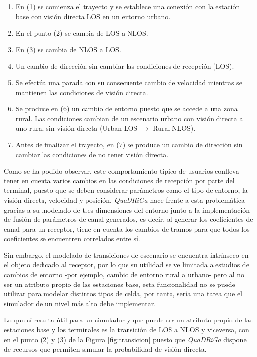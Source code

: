\begin{enumerate}
    \item En (1) se comienza el trayecto y se establece una conexión con la estación base con visión directa LOS en un entorno urbano.
    \item En el punto (2) se cambia de LOS a NLOS.
    \item En (3) se cambia de NLOS a LOS.
    \item Un cambio de dirección sin cambiar las condiciones de recepción (LOS).
    \item Se efectúa una parada con su consecuente cambio de velocidad mientras se mantienen las condiciones de visión directa.
    \item Se produce en (6) un cambio de entorno puesto que se accede a una zona rural. Las condiciones cambian de un escenario urbano con visión directa a uno rural sin visión directa (Urban LOS \(\rightarrow\) Rural NLOS).
    \item Antes de finalizar el trayecto, en (7) se produce un cambio de dirección sin cambiar las condiciones de no tener visión directa.
\end{enumerate}

Como se ha podido observar, este comportamiento típico de usuarios conlleva tener en cuenta varios cambios en las condiciones de recepción por parte del terminal, puesto que se deben considerar parámetros como el tipo de entorno, la visión directa, velocidad y  posición. \textit{QuaDRiGa} hace frente a esta problemática gracias a su modelado de tres dimensiones del entorno junto a la implementación de fusión de parámetros de canal generados, es decir, al generar los coeficientes de canal para un receptor, tiene en cuenta los cambios de tramos para que todos los coeficientes se encuentren correlados entre sí.

Sin embargo, el modelado de transiciones de escenario se encuentra intrínseco en el objeto dedicado al receptor, por lo que su utilidad se ve limitada a estudios de cambios de entorno -por ejemplo, cambio de entorno rural a urbano- pero al no ser un atributo propio de las estaciones base, esta funcionalidad no se puede utilizar para modelar distintos tipos de celda, por tanto, sería una tarea que el simulador de un nivel más alto debe implementar.

Lo que sí resulta útil para un simulador y que puede ser un atributo propio de las estaciones base y los terminales es la transición de LOS a NLOS y viceversa, con en el punto (2) y (3) de la Figura \ref{fig:transicion} puesto que \textit{QuaDRiGa} dispone de recursos que permiten simular la probabilidad de visión directa.

